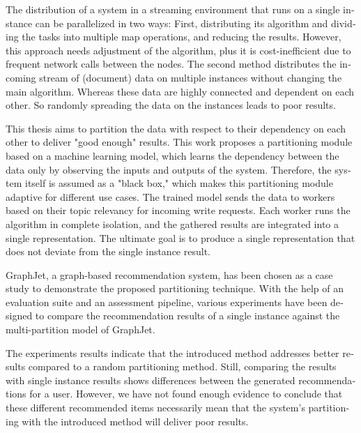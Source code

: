 
\null\vfil
\begin{otherlanguage}{english}
\begin{center}\textsf{\textbf{\abstractname}}\end{center}

\noindent
The distribution of a system in a streaming environment that runs on a single instance can be parallelized in two ways: First, distributing its algorithm and dividing the tasks into multiple map operations, and reducing the results. However, this approach needs adjustment of the algorithm, plus it is cost-inefficient due to frequent network calls between the nodes. The second method distributes the incoming stream of (document) data on multiple instances without changing the main algorithm. Whereas these data are highly connected and dependent on each other. So randomly spreading the data on the instances leads to poor results.

This thesis aims to partition the data with respect to their dependency on each other to deliver "good enough" results. This work proposes a partitioning module based on a machine learning model, which learns the dependency between the data only by observing the inputs and outputs of the system. Therefore, the system itself is assumed as a "black box," which makes this partitioning module adaptive for different use cases. The trained model sends the data to workers based on their topic relevancy for incoming write requests. Each worker runs the algorithm in complete isolation, and the gathered results are integrated into a single representation. The ultimate goal is to produce a single representation that does not deviate from the single instance result.

GraphJet, a graph-based recommendation system, has been chosen as a case study to demonstrate the proposed partitioning technique. With the help of an evaluation suite and an assessment pipeline, various experiments have been designed to compare the recommendation results of a single instance against the multi-partition model of GraphJet.


The experiments results indicate that the introduced method addresses better results compared to a random partitioning method. Still, comparing the results with single instance results shows differences between the generated recommendations for a user. However, we have not found enough evidence to conclude that these different recommended items necessarily mean that the system's partitioning with the introduced method will deliver poor results.


\end{otherlanguage}
\vfil\null
\newpage

